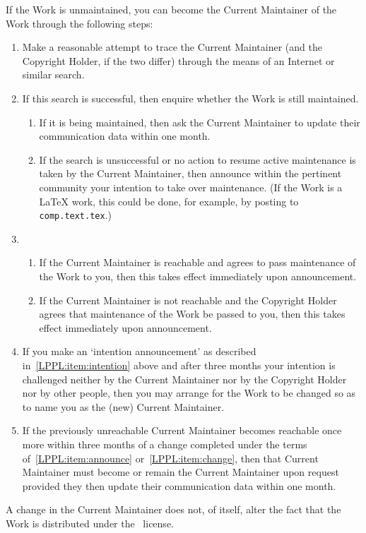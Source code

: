 \begin{LPPLicense}
    If the Work is unmaintained, you can become the Current Maintainer of the
    Work through the following steps:
    \begin{enumerate}
        \item Make a reasonable attempt to trace the Current Maintainer (and
            the Copyright Holder, if the two differ) through the means of an
            Internet or similar search.
        \item If this search is successful, then enquire whether the Work is
            still maintained.
            \begin{enumerate}
                \item If it is being maintained, then ask the Current
                    Maintainer to update their communication data within one
                    month.
                \item\label{LPPL:item:intention} If the search is unsuccessful
                    or no action to resume active maintenance is taken by the
                    Current Maintainer, then announce within the pertinent
                    community your intention to take over maintenance.  (If the
                    Work is a \LaTeX{} work, this could be done, for example,
                    by posting to \texttt{comp.text.tex}.)
            \end{enumerate}
        \item {}
            \begin{enumerate}
                \item If the Current Maintainer is reachable and agrees to
                    pass maintenance of the Work to you, then this takes effect
                    immediately upon announcement.
                \item\label{LPPL:item:announce} If the Current Maintainer is
                not reachable and the Copyright Holder agrees that maintenance
                of the Work be passed to you, then this takes effect
                immediately upon announcement.
            \end{enumerate}
        \item\label{LPPL:item:change} If you make an `intention
            announcement' as described in~\ref{LPPL:item:intention} above and
            after three months your intention is challenged neither by the
            Current Maintainer nor by the Copyright Holder nor by other people,
            then you may arrange for the Work to be changed so as to name you
            as the (new) Current Maintainer.
        \item If the previously unreachable Current Maintainer becomes
            reachable once more within three months of a change completed under
            the terms of~\ref{LPPL:item:announce} or~\ref{LPPL:item:change},
            then that Current Maintainer must become or remain the Current
            Maintainer upon request provided they then update their
            communication data within one month.
    \end{enumerate}
    A change in the Current Maintainer does not, of itself, alter the fact that
    the Work is distributed under the \LPPL\ license.


\end{LPPLicense}
